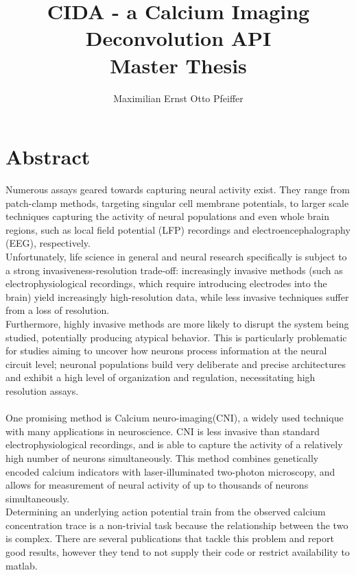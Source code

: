 \documentclass[titlepage]{article}
\title{CIDA - a Calcium Imaging Deconvolution API\\Master Thesis}
\author{Maximilian Ernst Otto Pfeiffer}
\begin{document}
\maketitle

\newpage
\tableofcontents
\newpage
\section{Abstract}

Numerous assays geared towards capturing neural activity exist. They range from patch-clamp methods, targeting singular cell membrane potentials, to larger scale techniques capturing the activity of neural populations and even whole brain regions, such as local field potential (LFP) recordings and electroencephalography (EEG), respectively.\\
Unfortunately, life science in general and neural research specifically is subject to a strong invasiveness-resolution trade-off: increasingly invasive methods (such as electrophysiological recordings, which require introducing electrodes into the brain) yield increasingly high-resolution data, while less invasive techniques suffer from a loss of resolution\cite{dayan_theoretical_2001}.\\
Furthermore, highly invasive methods are more likely to disrupt the system being studied, potentially producing atypical behavior. This is particularly problematic for studies aiming to uncover how neurons process information at the neural circuit level; neuronal populations build very deliberate and precise architectures and exhibit a high level of organization and regulation, necessitating high resolution assays\cite{pachitariu_extracting_2013}. \\\\
One promising method is Calcium neuro-imaging(CNI), a widely used technique with many applications in neuroscience. CNI is less invasive than standard electrophysiological recordings, and is able to capture the activity of a relatively high number of neurons simultaneously\cite{denk_two-photon_1990}.
This method combines genetically encoded calcium indicators with laser-illuminated two-photon microscopy, and allows for measurement of neural activity of up to thousands of neurons simultaneously\cite{dayan_theoretical_2001}\cite{dombeck_imaging_2007}\cite{yaksi_reconstruction_2006}.\\
Determining an underlying action potential train from the observed calcium concentration trace is a non-trivial task because the relationship between the two is complex. There are several publications that tackle this problem and report good results, however they tend to not supply their code or restrict availability to matlab\cite{pachitariu_extracting_2013}\cite{smith_parallel_2010}\cite{mukamel_automated_2009}\cite{maruyama_detecting_2014}\cite{tomek_two-photon_2013}.
\end{document}
